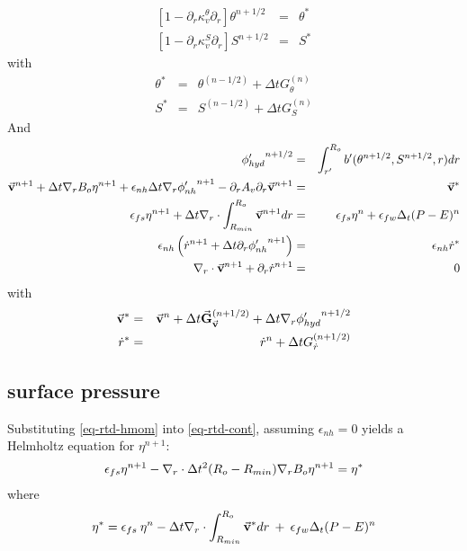 \begin{eqnarray*}
\left[ 1 - \partial_r \kappa_v^\theta \partial_r \right]
\theta^{n+1/2} & = & \theta^*
\\
\left[ 1 - \partial_r \kappa_v^S \partial_r \right]
S^{n+1/2} & = & S^*
\end{eqnarray*}
with
\begin{eqnarray*}
\theta^* & = &
\theta ^{(n-1/2)} + \Delta t G_{\theta} ^{(n)}
\\
S^* & = &
S ^{(n-1/2)} + \Delta t G_{S} ^{(n)}
\end{eqnarray*}
And 
\begin{eqnarray*}
{\phi'_{hyd}}^{n+1/2} & = & \int_{r'}^{R_o} b'(\theta^{n+1/2},S^{n+1/2},r) dr
\\
\vec{\bf v} ^{n+1}
+ \Delta t {\bf \nabla}_r B_o {\eta}^{n+1}
+ \epsilon_{nh} \Delta t {\bf \nabla}_r {\phi'_{nh}}^{n+1}
- \partial_r A_v \partial_r \vec{\bf v}^{n+1}
& = &
\vec{\bf v}^*
\\
\epsilon_{fs} {\eta}^{n+1} + \Delta t
{\bf \nabla}_r \cdot \int_{R_{min}}^{R_o} \vec{\bf v}^{n+1} dr
& = & 
\epsilon_{fs} {\eta}^{n} + \epsilon_{fw} \Delta_t (P-E)^{n} 
\\
\epsilon_{nh} \left( \dot{r} ^{n+1}
+ \Delta t \partial_r {\phi'_{nh}} ^{n+1}
\right)
& = & \epsilon_{nh} \dot{r}^*
\\
{\bf \nabla}_r \cdot \vec{\bf v}^{n+1} + \partial_r \dot{r}^{n+1}
& = & 0
\end{eqnarray*}
with
\begin{eqnarray*}
\vec{\bf v}^* & = &
\vec{\bf v} ^{n} + \Delta t \vec{\bf G}_{\vec{\bf v}} ^{(n+1/2)}
+ \Delta t  {\bf \nabla}_r {\phi'_{hyd}}^{n+1/2}
\\
\dot{r}^* & = &
\dot{r} ^{n} + \Delta t G_{\dot{r}} ^{(n+1/2)}
\end{eqnarray*}


\subsection{surface pressure}

Substituting \ref{eq-rtd-hmom} into \ref{eq-rtd-cont}, assuming
$\epsilon_{nh} = 0$ yields a Helmholtz equation for ${\eta}^{n+1}$:
\begin{eqnarray}
\epsilon_{fs} {\eta}^{n+1} -
{\bf \nabla}_r \cdot \Delta t^2 (R_o-R_{min})
{\bf \nabla}_r B_o {\eta}^{n+1}
= {\eta}^*
\label{solve_2d}
\end{eqnarray}
where
\begin{eqnarray}
{\eta}^* = \epsilon_{fs} \: {\eta}^{n} -
\Delta t {\bf \nabla}_r \cdot \int_{R_{min}}^{R_o} \vec{\bf v}^* dr
\: + \: \epsilon_{fw} \Delta_t (P-E)^{n} 
\label{solve_2d_rhs}
\end{eqnarray}

